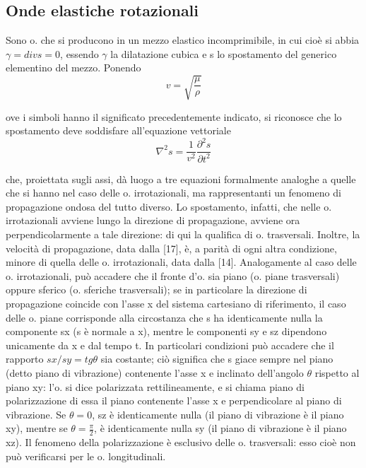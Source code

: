 \documentclass[a4paper]{article}
\begin{document}
\subsection{Onde elastiche rotazionali}
Sono o. che si producono in un mezzo elastico incomprimibile, in cui cioè si abbia $\gamma=div s=0$, essendo $\gamma$ la dilatazione cubica e s lo spostamento del generico elementino del mezzo. Ponendo 
\begin{equation}
v=\sqrt{\frac{\mu}{\rho}}
\end{equation}

ove i simboli hanno il significato precedentemente indicato, si riconosce che lo spostamento deve soddisfare all'equazione vettoriale 
\begin{equation}
\nabla^2 s =\frac{1}{v^2}\frac{\partial^2 s}{\partial t^2}
\end{equation}

che, proiettata sugli assi, dà luogo a tre equazioni formalmente analoghe a quelle che si hanno nel caso delle o. irrotazionali, ma rappresentanti un fenomeno di propagazione ondosa del tutto diverso. Lo spostamento, infatti, che nelle o. irrotazionali avviene lungo la direzione di propagazione, avviene ora perpendicolarmente a tale direzione: di qui la qualifica di o. trasversali. Inoltre, la velocità di propagazione, data dalla [17], è, a parità di ogni altra condizione, minore di quella delle o. irrotazionali, data dalla [14]. Analogamente al caso delle o. irrotazionali, può accadere che il fronte d'o. sia piano (o. piane trasversali) oppure sferico (o. sferiche trasversali); se in particolare la direzione di propagazione coincide con l'asse x del sistema cartesiano di riferimento, il caso delle o. piane corrisponde alla circostanza che s ha identicamente nulla la componente sx (s è normale a x), mentre le componenti sy e sz dipendono unicamente da x e dal tempo t. In particolari condizioni può accadere che il rapporto $sx/sy=tg \theta$ sia costante; ciò significa che s giace sempre nel piano (detto piano di vibrazione) contenente l'asse x e inclinato dell'angolo $\theta$ rispetto al piano xy: l'o. si dice polarizzata rettilineamente, e si chiama piano di polarizzazione di essa il piano contenente l'asse x e perpendicolare al piano di vibrazione. Se $\theta=0$, sz è identicamente nulla (il piano di vibrazione è il piano xy), mentre se $\theta=\frac{\pi}{2}$, è identicamente nulla sy (il piano di vibrazione è il piano xz). Il fenomeno della polarizzazione è esclusivo delle o. trasversali: esso cioè non può verificarsi per le o. longitudinali. 
\end{document}
